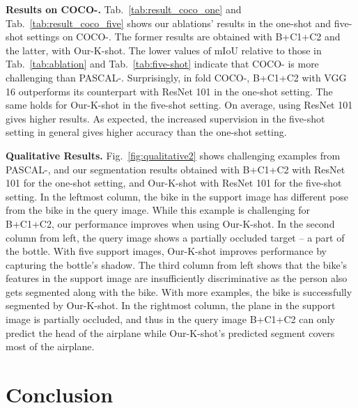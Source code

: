 \documentclass[10pt,twocolumn,letterpaper]{article}
\begin{document}
{\bf Results on COCO-.}
 Tab.~\ref{tab:result_coco_one} and Tab.~\ref{tab:result_coco_five} shows our ablations' results in the one-shot and five-shot settings on COCO-. The former results are obtained with B+C1+C2 and the latter, with Our-K-shot.
 The lower values of mIoU relative to those in Tab.~\ref{tab:ablation} and Tab.~\ref{tab:five-shot} indicate that COCO- is more challenging than PASCAL-. Surprisingly, in fold COCO-, B+C1+C2 with VGG 16 outperforms its counterpart with ResNet 101 in the one-shot setting. The same holds for Our-K-shot in the five-shot setting. On average, using ResNet 101 gives higher results. As expected, the increased supervision in the five-shot setting in general gives higher accuracy than the one-shot setting.


{\bf Qualitative Results.}
Fig.~\ref{fig:qualitative2} shows challenging examples from  PASCAL-, and our segmentation results obtained with B+C1+C2 with ResNet 101 for the one-shot setting, and Our-K-shot with ResNet 101 for the five-shot setting. In the leftmost column, the bike in the support image has different pose from the bike in the query image. While this example is challenging for B+C1+C2, our performance improves when using Our-K-shot. In the second column from left, the query image shows a partially occluded target -- a part of the bottle. With five support images, Our-K-shot improves performance by capturing the bottle's shadow. The third column from left shows that the bike's features in the support image are insufficiently discriminative as the person also gets segmented along with the bike. With more examples, the bike is successfully segmented by Our-K-shot. In the rightmost column, the plane in the support image is partially occluded, and thus in the query image B+C1+C2 can only predict the head of the airplane while Our-K-shot's predicted segment covers most of the airplane.


\section{Conclusion}\label{sec:conclusion}
\end{document}
